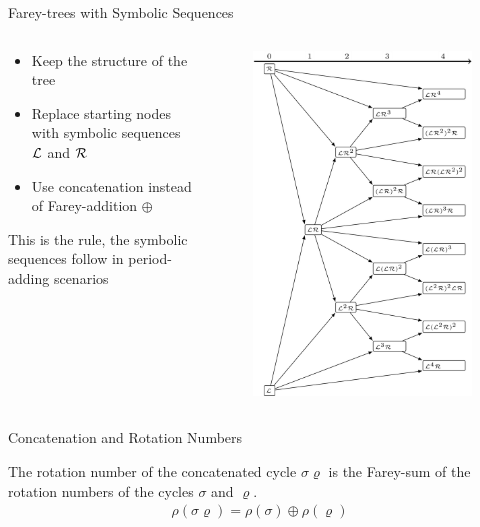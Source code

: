 \begin{frame}{Farey-trees with Symbolic Sequences}
	\begin{columns}
		\begin{column}{.5 \textwidth}
			\begin{itemize}
				\item Keep the structure of the tree
				\item Replace starting nodes with symbolic sequences $\mathcal{L}$ and $\mathcal{R}$
				\item Use concatenation instead of Farey-addition $\oplus$
			\end{itemize}
			\pause
			\vspace{2em}
			This is the rule, the symbolic sequences follow in period-adding scenarios
		\end{column}
		\begin{column}{.5 \textwidth}
			\vspace{-3em}
			\begin{figure}
				\includegraphics[width=.6 \textwidth]{../../Report/Figures/FareyTrees/LR/adding.png}
			\end{figure}
		\end{column}
	\end{columns}
\end{frame}

\begin{frame}{Concatenation and Rotation Numbers}
	\begin{theorem}
		The rotation number of the concatenated cycle $\sigma\varrho$ is the Farey-sum of the rotation numbers of the cycles $\sigma$ and $\varrho$.
		\begin{align*}
			\rho(\sigma\varrho) = \rho(\sigma) \oplus \rho(\varrho)
		\end{align*}
	\end{theorem}
\end{frame}

